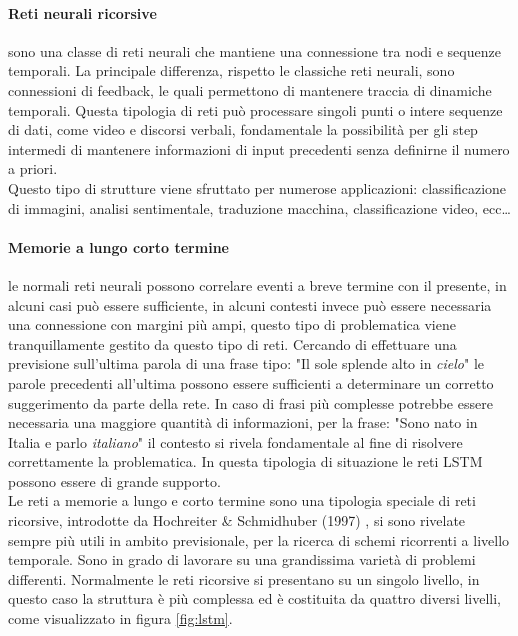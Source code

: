 \documentclass[%
    corpo=12pt,
    twoside,
    oldstyle,
    autoretitolo,
    greek,
    evenboxes,
]{toptesi}
\begin{document}
\paragraph{Reti neurali ricorsive} sono una classe di reti neurali che mantiene una connessione tra nodi e sequenze temporali. La principale differenza, rispetto le classiche reti neurali, sono connessioni di feedback, le quali permettono di mantenere traccia di dinamiche temporali. Questa tipologia di reti può processare singoli punti o intere sequenze di dati, come video e discorsi verbali, fondamentale la possibilità per gli step intermedi di mantenere informazioni di input precedenti senza definirne il numero a priori.\\
Questo tipo di strutture viene sfruttato per numerose applicazioni: classificazione di immagini, analisi sentimentale, traduzione macchina, classificazione video, ecc\dots

\paragraph{Memorie a lungo corto termine} le normali reti neurali possono correlare eventi a breve termine con il presente, in alcuni casi può essere sufficiente, in alcuni contesti invece può essere necessaria una connessione con margini più ampi, questo tipo di problematica viene tranquillamente gestito da questo tipo di reti. Cercando di effettuare una previsione sull'ultima parola di una frase tipo: "Il sole splende alto in \textit{cielo}" le parole precedenti all'ultima possono essere sufficienti a determinare un corretto suggerimento da parte della rete. In caso di frasi più complesse potrebbe essere necessaria una maggiore quantità di informazioni, per la frase: "Sono nato in Italia e parlo \textit{italiano}" il contesto si rivela fondamentale al fine di risolvere correttamente la problematica. In questa tipologia di situazione le reti LSTM possono essere di grande supporto.\\
Le reti a memorie a lungo e corto termine sono una tipologia speciale di reti ricorsive, introdotte da Hochreiter \& Schmidhuber (1997) \cite{lstm}, si sono rivelate sempre più utili in ambito previsionale, per la ricerca di schemi ricorrenti a livello temporale. Sono in grado di lavorare su una grandissima varietà di problemi differenti. Normalmente le reti ricorsive si presentano su un singolo livello, in questo caso la struttura è più complessa ed è costituita da quattro diversi livelli, come visualizzato in figura \ref{fig:lstm}.
\end{document}
